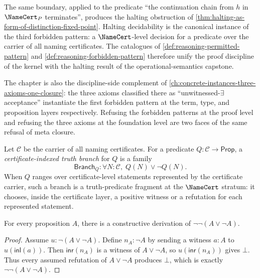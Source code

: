 \begin{remark}
\label{rem:reasoning-halting-sibling}
The same boundary, applied to the predicate ``the continuation chain from $h$ in $\NameCert_P$ terminates'', produces the halting obstruction of \autoref{thm:halting-as-form-of-distinction-fixed-point}. Halting decidability is the canonical instance of the third forbidden pattern: a $\NameCert$-level decision for a predicate over the carrier of all naming certificates. The catalogues of \autoref{def:reasoning-permitted-pattern} and \autoref{def:reasoning-forbidden-pattern} therefore unify the proof discipline of the kernel with the halting result of the operational-semantics capstone.
\end{remark}

\begin{remark}
\label{rem:reasoning-three-axioms-sibling}
The chapter is also the discipline-side complement of \autoref{ch:concrete-instances-three-axioms-one-closure}: the three axioms classified there as ``unwitnessed-$\exists$ acceptance'' instantiate the first forbidden pattern at the term, type, and proposition layers respectively. Refusing the forbidden patterns at the proof level and refusing the three axioms at the foundation level are two faces of the same refusal of meta closure.
\end{remark}

\begin{definition}
\label{def:reasoning-certificate-indexed-truth-branch}
Let $\mathcal C$ be the carrier of all naming certificates. For a predicate $Q:\mathcal C\to\mathsf{Prop}$, a \emph{certificate-indexed truth branch} for $Q$ is a family
$$
\mathsf{Branch}_Q:\forall N:\mathcal C,\; Q(N)\vee\neg Q(N).
$$
When $Q$ ranges over certificate-level statements represented by the certificate carrier, such a branch is a truth-predicate fragment at the $\NameCert$ stratum: it chooses, inside the certificate layer, a positive witness or a refutation for each represented statement.
\end{definition}

\begin{lemma}
\label{lem:reasoning-excluded-middle-branch-double-negated}
For every proposition $A$, there is a constructive derivation of $\neg\neg(A\vee\neg A)$.
\end{lemma}

\begin{proof}
Assume $u:\neg(A\vee\neg A)$. Define $n_A:\neg A$ by sending a witness $a:A$ to $u(\mathsf{inl}(a))$. Then $\mathsf{inr}(n_A)$ is a witness of $A\vee\neg A$, so $u(\mathsf{inr}(n_A))$ gives $\bot$. Thus every assumed refutation of $A\vee\neg A$ produces $\bot$, which is exactly $\neg\neg(A\vee\neg A)$.
\end{proof}

